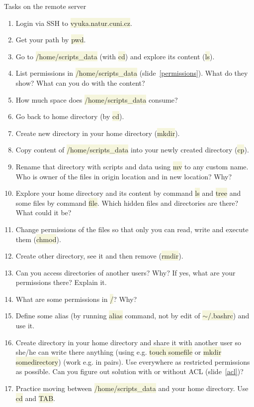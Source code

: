 \documentclass[compress, ucs, xelatex, 11pt, xcolor=svgnames, aspectratio=169,
	hyperref={
		bookmarks=true,
		unicode=true,
		colorlinks=true,
		pdftitle={Linux, command line and MetaCentrum},
		plainpages=false,
		pdfauthor={Vojtech Zeisek},
		pdfsubject={Course about use of Linux command line, writing shell scripts and using MetaCentrum of CESNET},
		pdfcreator={XeLaTeX},
		pdfkeywords={Linux, GNU, BASH, shell, command line, MetaCentrum},
		linkcolor=DarkRed, %
		anchorcolor=DarkBlue, %
		citecolor=Indigo, %
		filecolor=NavyBlue, %
		menucolor=DarkMagenta, %
		urlcolor=DarkBlue, %
		pdftex},
	url={hyphens, lowtilde} %
	]{beamer}
\renewcommand{\texttt}[1]{\colorbox{Beige}{{\ttfamily #1}}}
\begin{document}
\begin{frame}[allowframebreaks]{Tasks on the remote server}
	\begin{enumerate}
		\item Login via SSH to \texttt{vyuka.natur.cuni.cz}.
		\item Get your path by \texttt{pwd}.
		\item Go to \texttt{/home/scripts\_data} (with \texttt{cd}) and explore its content (\texttt{ls}).
		\item List permissions in \texttt{/home/scripts\_data} (slide~\ref{permissions}). What do they show? What can you do with the content?
		\item How much space does \texttt{/home/scripts\_data} consume?
		\item Go back to home directory (by \texttt{cd}).
		\item Create new directory in your home directory (\texttt{mkdir}).
		\item Copy content of \texttt{/home/scripts\_data} into your newly created directory (\texttt{cp}).
		\item Rename that directory with scripts and data using \texttt{mv} to any custom name. Who is owner of the files in origin location and in new location? Why?
		\item Explore your home directory and its content by command \texttt{ls} and \texttt{tree} and some files by command \texttt{file}. Which hidden files and directories are there? What could it be?
		\item Change permissions of the files so that only you can read, write and execute them (\texttt{chmod}).
		\item Create other directory, see it and then remove (\texttt{rmdir}).
		\item Can you access directories of another users? Why? If yes, what are your permissions there? Explain it.
		\item What are some permissions in \texttt{/}? Why?
		\item Define some alias (by running \texttt{alias} command, not by edit of \texttt{$\sim$/.bashrc}) and use it.
		\item Create directory in your home directory and share it with another user so she/he can write there anything (using e.g. \texttt{touch somefile} or \texttt{mkdir somedirectory}) (work e.g. in pairs). Use everywhere as restricted permissions as possible. Can you figure out solution with or without ACL (slide~\ref{acl})?
		\item Practice moving between \texttt{/home/scripts\_data} and your home directory. Use \texttt{cd} and \texttt{TAB}.

\end{enumerate}
\end{frame}
\end{document}

